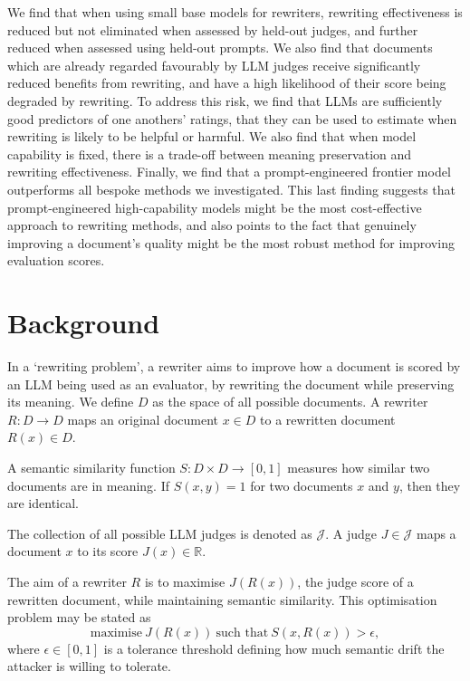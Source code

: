 \documentclass{article}
\begin{document}
We find that when using small base models for rewriters, rewriting effectiveness is reduced but not eliminated when assessed by held-out judges, and further reduced when assessed using held-out prompts. We also find that documents which are already regarded favourably by LLM judges receive significantly reduced benefits from rewriting, and have a high likelihood of their score being degraded by rewriting. To address this risk, we find that LLMs are sufficiently good predictors of one anothers' ratings, that they can be used to estimate when rewriting is likely to be helpful or harmful. We also find that when model capability is fixed, there is a trade-off between meaning preservation and rewriting effectiveness. Finally, we find that a prompt-engineered frontier model outperforms all bespoke methods we investigated. This last finding suggests that prompt-engineered high-capability models might be the most cost-effective approach to rewriting methods, and also points to the fact that genuinely improving a document's quality might be the most robust method for improving evaluation scores.

\section{Background}

In a `rewriting problem', a rewriter aims to improve how a document is scored by an LLM being used as an evaluator, by rewriting the document while preserving its meaning. We define $D$ as the space of all possible documents. A rewriter $R : D \to D$ maps an original document $x \in D$ to a rewritten document $R(x) \in D$.

A semantic similarity function $S : D \times D \to [0,1]$ measures how similar two documents are in meaning. If $S(x,y) = 1$ for two documents $x$ and $y$, then they are identical.

The collection of all possible LLM judges is denoted as $\mathcal{J}$. A judge $J \in \mathcal{J}$ maps a document $x$ to its score $J(x) \in \mathbb{R}$. 

The aim of a rewriter $R$ is to maximise $J(R(x))$, the judge score of a rewritten document, while maintaining semantic similarity. This optimisation problem may be stated as
\begin{equation}\label{eq:known}
  \text{maximise} \ J(R(x)) \ \text{such that} \ S(x,R(x)) > \epsilon,
\end{equation}
where $\epsilon \in [0,1]$ is a tolerance threshold defining how much semantic drift the attacker is willing to tolerate.
\end{document}
